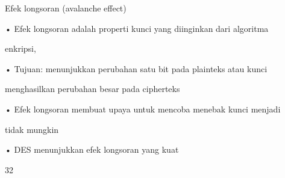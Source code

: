 \documentclass{article}
\begin{document}

Efek longsoran (avalanche effect)

• Efek longsoran adalah properti kunci yang diinginkan dari algoritma 

enkripsi,

• Tujuan: menunjukkan perubahan satu bit pada plainteks atau kunci 

menghasilkan perubahan besar pada cipherteks

• Efek longsoran membuat upaya untuk mencoba menebak kunci menjadi

tidak mungkin 

• DES menunjukkan efek longsoran yang kuat

32
\end{document}
